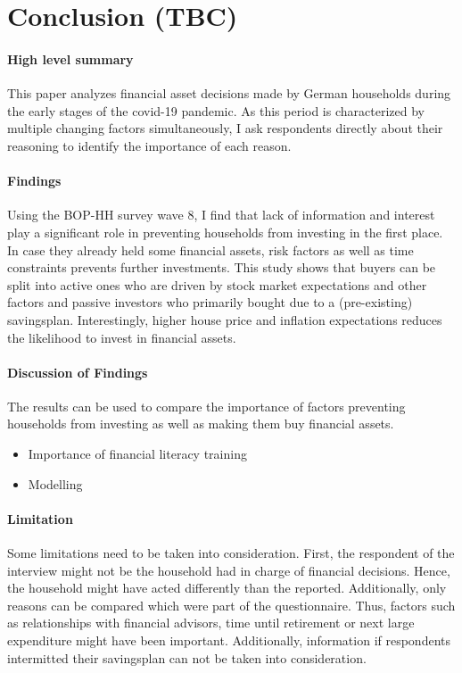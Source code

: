 \documentclass[ProjectABM]{subfiles}
\begin{document}
\section{Conclusion (TBC)}\label{sec:conclusion}
\paragraph{High level summary}
This paper analyzes financial asset decisions made by German households during the early stages of the covid-19 pandemic. As this period is characterized by multiple changing factors simultaneously, I ask respondents directly about their reasoning to identify the importance of each reason. 

\paragraph{Findings}
Using the BOP-HH survey wave 8, I find that lack of information and interest play a significant role in preventing households from investing in the first place. In case they already held some financial assets, risk factors as well as time constraints prevents further investments. This study shows that buyers can be split into active ones who are driven by stock market expectations and other factors and passive investors who primarily bought due to a (pre-existing) savingsplan. Interestingly, higher house price and inflation expectations reduces the likelihood to invest in financial assets.

\paragraph{Discussion of Findings}
The results can be used to compare the importance of factors preventing households from investing as well as making them buy financial assets.
\begin{itemize}
	\item Importance of financial literacy training
	\item Modelling
\end{itemize}

\paragraph{Limitation}
Some limitations need to be taken into consideration. First, the respondent of the interview might not be the household had in charge of financial decisions. Hence, the household might have acted differently than the reported. Additionally, only reasons can be compared which were part of the questionnaire. Thus, factors such as relationships with financial advisors, time until retirement or next large expenditure might have been important. Additionally, information if respondents intermitted their savingsplan can not be taken into consideration.
\end{document}
